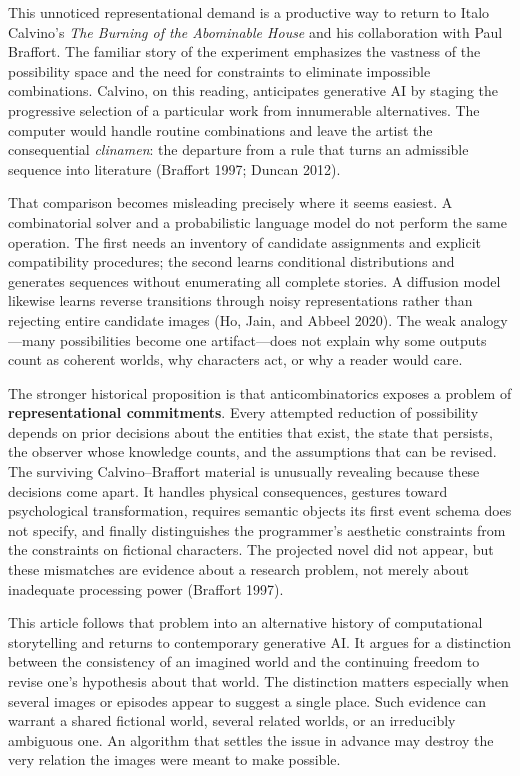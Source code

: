 \documentclass[
  11pt,
  letterpaper,
]{article}
\begin{document}
This unnoticed representational demand is a productive way to return to
Italo Calvino's \emph{The Burning of the Abominable House} and his
collaboration with Paul Braffort. The familiar story of the experiment
emphasizes the vastness of the possibility space and the need for
constraints to eliminate impossible combinations. Calvino, on this
reading, anticipates generative AI by staging the progressive selection
of a particular work from innumerable alternatives. The computer would
handle routine combinations and leave the artist the consequential
\emph{clinamen}: the departure from a rule that turns an admissible
sequence into literature (Braffort 1997; Duncan 2012).

That comparison becomes misleading precisely where it seems easiest. A
combinatorial solver and a probabilistic language model do not perform
the same operation. The first needs an inventory of candidate
assignments and explicit compatibility procedures; the second learns
conditional distributions and generates sequences without enumerating
all complete stories. A diffusion model likewise learns reverse
transitions through noisy representations rather than rejecting entire
candidate images (Ho, Jain, and Abbeel 2020). The weak analogy---many
possibilities become one artifact---does not explain why some outputs
count as coherent worlds, why characters act, or why a reader would
care.

The stronger historical proposition is that anticombinatorics exposes a
problem of \textbf{representational commitments}. Every attempted
reduction of possibility depends on prior decisions about the entities
that exist, the state that persists, the observer whose knowledge
counts, and the assumptions that can be revised. The surviving
Calvino--Braffort material is unusually revealing because these
decisions come apart. It handles physical consequences, gestures toward
psychological transformation, requires semantic objects its first event
schema does not specify, and finally distinguishes the programmer's
aesthetic constraints from the constraints on fictional characters. The
projected novel did not appear, but these mismatches are evidence about
a research problem, not merely about inadequate processing power
(Braffort 1997).

This article follows that problem into an alternative history of
computational storytelling and returns to contemporary generative AI. It
argues for a distinction between the consistency of an imagined world
and the continuing freedom to revise one's hypothesis about that world.
The distinction matters especially when several images or episodes
appear to suggest a single place. Such evidence can warrant a shared
fictional world, several related worlds, or an irreducibly ambiguous
one. An algorithm that settles the issue in advance may destroy the very
relation the images were meant to make possible.
\end{document}
